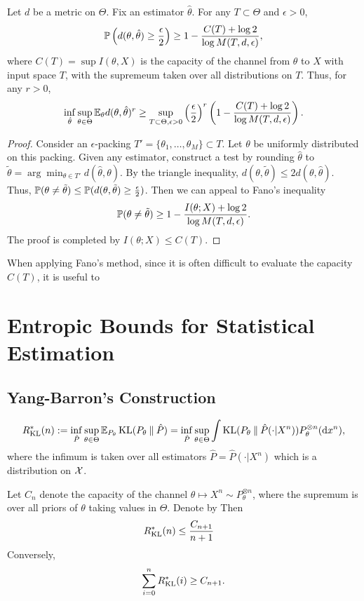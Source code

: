 \begin{theorem}
    Let $d$ be a metric on $\Theta$. Fix an estimator $\hat\theta$.
    For any $T\subset \Theta$ and $\epsilon>0$,
    \begin{equation*}
        \mathbb{P}\left(d(\theta,\hat\theta)\geq\frac{\epsilon}{2}\right)\geq 1-\frac{C(T)+\log 2}{\log M(T,d,\epsilon)},
    \end{equation*}
    where $C(T)=\sup I(\theta,X)$ is the capacity of the channel from $\theta$ to $X$ with input space $T$, with the supremeum taken over all distributions on $T$.
    Thus, for any $r>0$,
    \begin{equation*}
        \inf_{\hat\theta}\sup_{\theta\in\Theta}\mathbb{E}_\theta d(\theta,\hat\theta)^r\geq \sup_{T\subset\Theta,\epsilon>0}\left(\frac{\epsilon}{2}\right)^r\left(1-\frac{C(T)+\log 2}{\log M(T,d,\epsilon)}\right).
    \end{equation*}
\end{theorem}
\begin{proof}
    Consider an $\epsilon$-packing $T'=\{\theta_1,\dots,\theta_M\}\subset T$. 
    Let $\theta$ be uniformly distributed on this packing.
    Given any estimator, construct a test by rounding $\hat\theta$ to $\tilde{\theta}=\arg\min_{\theta\in T'}d(\hat\theta,\theta)$.
    By the triangle inequality, $d(\theta,\tilde{\theta})\leq 2 d(\theta,\hat\theta)$.
    Thus, $\mathbb{P}(\theta\neq\tilde{\theta})\leq \mathbb{P}(d(\theta,\tilde{\theta})\geq \frac{\epsilon}{2})$.
    Then we can appeal to Fano's inequality 
    \[\mathbb{P}(\theta\neq\tilde{\theta})\geq 1-\frac{I(\theta;X)+\log 2}{\log M(T,d,\epsilon)}.\]
    The proof is completed by $I(\theta;X)\leq C(T)$.
\end{proof}

When applying Fano's method, since it is often difficult to evaluate the capacity $C(T)$,
it is useful to 


\section{Entropic Bounds for Statistical Estimation} 

\subsection{Yang-Barron's Construction}

\[R^*_{\operatorname{KL}}(n):=\inf_{\hat P}\sup_{\theta\in\Theta}\mathbb{E}_{P_\theta}\operatorname{KL}(P_\theta\mathbin{\|} \hat{P})=\inf_{\hat P}\sup_{\theta\in\Theta}\int \operatorname{KL}(P_\theta\mathbin{\|}\hat{P}(\cdot|X^n))P_\theta^{\otimes n}(\mathrm{d} x^n),\]
where the infimum is taken over all estimators $\hat{P}=\hat{P}(\cdot| X^n)$ which is a distribution on $\mathcal{X}$.
\begin{theorem}\label{thm:Yang-Barron}
    Let $C_n$ denote the capacity of the channel $\theta\mapsto X^n\sim P_\theta^{\otimes n}$,
    where the supremum is over all priors of $\theta$ taking values in $\Theta$.
    Denote by 
     Then
    \begin{align*}
        R^*_{\operatorname{KL}}(n)&\leq \frac{C_{n+1}}{n+1}
    \end{align*}
    Conversely,
    \[\sum_{i=0}^n R^*_{\operatorname{KL}}(i)\geq C_{n+1}.\]
\end{theorem}

